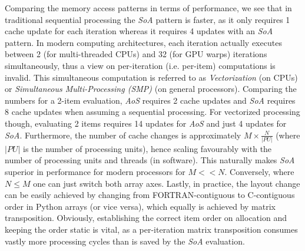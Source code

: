 \documentclass[supplement,onefignum,onetabnum]{siamart190516} %
\begin{document}
Comparing the memory access patterns in terms of performance, we see that in traditional sequential processing the \textit{SoA} pattern is faster, as it only requires 1 cache update for each iteration whereas it requires 4 updates with an \textit{SoA} pattern. In modern computing architectures, each iteration actually executes between 2 (for multi-threaded CPUs) and 32 (for GPU warps) iterations simultaneously, thus a view on per-iteration (i.e. per-item) computations is invalid. This simultaneous computation is referred to as \textit{Vectorization} (on CPUs) or \textit{Simultaneous Multi-Processing (SMP)} (on general processors). Comparing the numbers for a 2-item evaluation, \textit{AoS} requires 2 cache updates and \textit{SoA} requires 8 cache updates when assuming a sequential processing. For vectorized processing though, evaluating 2 items requires 14 updates for \textit{AoS} and just 4 updates for \textit{SoA}. Furthermore, the number of cache changes is approximately $M \times \frac{N}{|PU|}$ (where $|PU|$ is the number of processing units), hence scaling favourably with the number of processing units and threads (in software). This naturally makes \textit{SoA} superior in performance for modern processors for $M << N$. Conversely, where $N \leq M$ one can just switch both array axes. Lastly, in practice, the layout change can be easily achieved by changing from FORTRAN-contiguous to C-contiguous order in Python arrays (or vice versa), which equally is achieved by matrix transposition. Obviously, establishing the correct item order on allocation and keeping the order static is vital, as a per-iteration matrix transposition consumes vastly more processing cycles than is saved by the \textit{SoA} evaluation.


 






\end{document}
